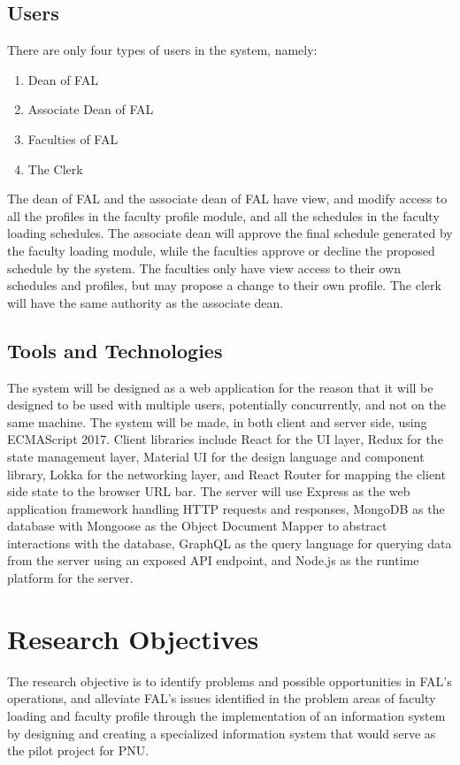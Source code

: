 \subsection{Users}
There are only four types of users in the system, namely:
\begin{enumerate}
\item Dean of FAL
\item Associate Dean of FAL
\item Faculties of FAL
\item The Clerk
\end{enumerate}

The dean of FAL and the associate dean of FAL have view, and modify access to all the profiles in the faculty profile module, and all the schedules in the faculty loading schedules. The associate dean will approve the final schedule generated by the faculty loading module, while the faculties approve or decline the proposed schedule by the system. The faculties only have view access to their own schedules and profiles, but may propose a change to their own profile. The clerk will have the same authority as the associate dean.

\subsection{Tools and Technologies}
The system will be designed as a web application for the reason that it will be designed to be used with multiple users, potentially concurrently, and not on the same machine. The system will be made, in both client and server side, using ECMAScript 2017. Client libraries include React for the UI layer, Redux for the state management layer, Material UI for the design language and component library, Lokka for the networking layer, and React Router for mapping the client side state to the browser URL bar. The server will use Express as the web application framework handling HTTP requests and responses, MongoDB as the database with Mongoose as the Object Document Mapper to abstract interactions with the database, GraphQL as the query language for querying data from the server using an exposed API endpoint, and Node.js as the runtime platform for the server.

\section{Research Objectives}
The research objective is to identify problems and possible opportunities in FAL's operations, and alleviate FAL's issues identified in the problem areas of faculty loading and faculty profile through the implementation of an information system by designing and creating a specialized information system that would serve as the pilot project for PNU.

